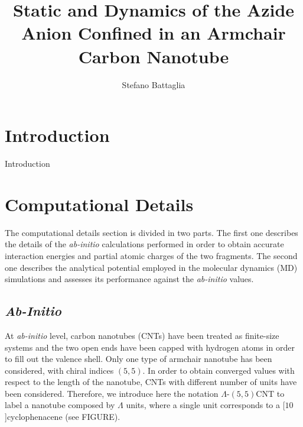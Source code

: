 \documentclass[utf8]{article}
\title{\LARGE Static and Dynamics of the Azide Anion Confined in an Armchair Carbon Nanotube}
\author{Stefano Battaglia}
\begin{document}
\maketitle

\section{Introduction}
Introduction

\section{Computational Details}
The computational details section is divided in two parts.
The first one describes the details of the \textit{ab-initio} calculations performed in order to obtain accurate interaction energies and partial atomic charges of the two fragments.
The second one describes the analytical potential employed in the molecular dynamics (MD) simulations and assesses its performance against the \textit{ab-initio} values.


\subsection{\textit{Ab-Initio}}
At \textit{ab-initio} level, carbon nanotubes (CNTs) have been treated as finite-size systems and the two open ends have been capped with hydrogen atoms in order to fill out the valence shell. Only one type of armchair nanotube has been considered, with chiral indices $(5,5)$. In order to obtain converged values with respect to the length of the nanotube, CNTs with different number of units have been considered. Therefore, we introduce here the notation $\Lambda$-$(5,5)$CNT to label a nanotube composed by $\Lambda$ units, where a single unit corresponds to a [$10$]cyclophenacene (see FIGURE).
\end{document}
